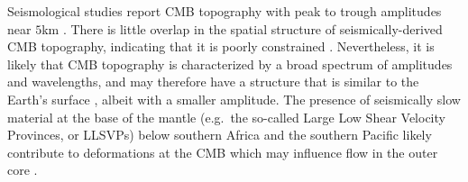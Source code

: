 Seismological studies report CMB topography with peak to trough amplitudes near $5$km \citep{sT10,kK03}.
There is little overlap in the spatial structure of seismically-derived CMB topography, indicating that it is poorly constrained \citep[e.g.][]{pK21}. 
Nevertheless, it is likely that CMB topography is characterized by a broad spectrum of amplitudes and wavelengths, and may therefore have a structure that is similar to the Earth's surface \citep[e.g.][]{aE18,mP23}, albeit with a smaller amplitude. 
The presence of seismically slow material at the base of the mantle (e.g.~the so-called Large Low Shear Velocity Provinces, or LLSVPs) below southern Africa and the southern Pacific \citep[e.g.][]{sC16} likely contribute to deformations at the CMB which may influence flow in the outer core \citep{jT15}. 


